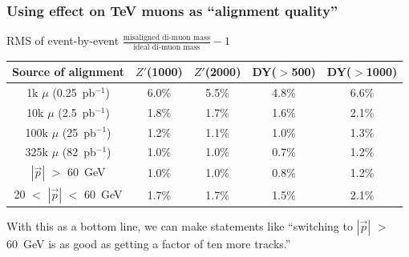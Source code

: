 \documentclass[compress]{beamer}
\begin{document}
\begin{frame}
\frametitle{Using effect on TeV muons as ``alignment quality''}
\begin{center}
RMS of event-by-event $\displaystyle \frac{\mbox{misaligned di-muon mass}}{\mbox{ideal di-muon mass}} - 1$
\end{center}

\renewcommand{\arraystretch}{1.2}
\begin{tabular}{c c c c c}
Source of alignment & $Z'$(1000) & $Z'$(2000) & \hspace{-0.1cm}DY($>$500)\hspace{-0.1cm} & \hspace{-0.1cm}DY($>$1000)\hspace{-0.1cm} \\\hline
1k $\mu$ (0.25~pb$^{-1}$) & 6.0\% & 5.5\% & 4.8\% & 6.6\% \\
10k $\mu$ (2.5~pb$^{-1}$) & 1.8\% & 1.7\% & 1.6\% & 2.1\% \\
100k $\mu$ (25~pb$^{-1}$) & 1.2\% & 1.1\% & 1.0\% & 1.3\% \\
325k $\mu$ (82~pb$^{-1}$) & 1.0\% & 1.0\% & 0.7\% & 1.2\% \\\hline
$|\vec{p}|$ $>$ 60~GeV & 1.0\% & 1.0\% & 0.8\% & 1.2\% \\
20 $<$ $|\vec{p}|$ $<$ 60~GeV & 1.7\% & 1.7\% & 1.5\% & 2.1\%
\end{tabular}

\vfill\vfill With this as a bottom line, we can make statements like
``switching to $|\vec{p}|$ $>$ 60~GeV is as good as getting a factor of
ten more tracks.''
\end{frame}
\end{document}
